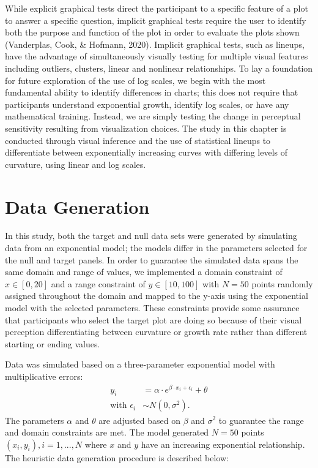 \documentclass[print]{nuthesis}
\begin{document}
While explicit graphical tests direct the participant to a specific feature of a plot to answer a specific question, implicit graphical tests require the user to identify both the purpose and function of the plot in order to evaluate the plots shown (Vanderplas, Cook, \& Hofmann, 2020).
Implicit graphical tests, such as lineups, have the advantage of simultaneously visually testing for multiple visual features including outliers, clusters, linear and nonlinear relationships.
To lay a foundation for future exploration of the use of log scales, we begin with the most fundamental ability to identify differences in charts; this does not require that participants understand exponential growth, identify log scales, or have any mathematical training.
Instead, we are simply testing the change in perceptual sensitivity resulting from visualization choices.
The study in this chapter is conducted through visual inference and the use of statistical lineups to differentiate between exponentially increasing curves with differing levels of curvature, using linear and log scales.

\hypertarget{data-generation}{%
\section{Data Generation}\label{data-generation}}

In this study, both the target and null data sets were generated by simulating data from an exponential model; the models differ in the parameters selected for the null and target panels.
In order to guarantee the simulated data spans the same domain and range of values, we implemented a domain constraint of \(x\in [0,20]\) and a range constraint of \(y\in [10,100]\) with \(N = 50\) points randomly assigned throughout the domain and mapped to the y-axis using the exponential model with the selected parameters.
These constraints provide some assurance that participants who select the target plot are doing so because of their visual perception differentiating between curvature or growth rate rather than different starting or ending values.

Data was simulated based on a three-parameter exponential model with multiplicative errors:
\begin{align}
y_i & = \alpha\cdot e^{\beta\cdot x_i + \epsilon_i} + \theta \\
\text{with } \epsilon_i & \sim N(0, \sigma^2). \nonumber
\end{align}
The parameters \(\alpha\) and \(\theta\) are adjusted based on \(\beta\) and \(\sigma^2\) to guarantee the range and domain constraints are met.
The model generated \(N = 50\) points \((x_i, y_i), i = 1,...,N\) where \(x\) and \(y\) have an increasing exponential relationship.
The heuristic data generation procedure is described below:
\end{document}
